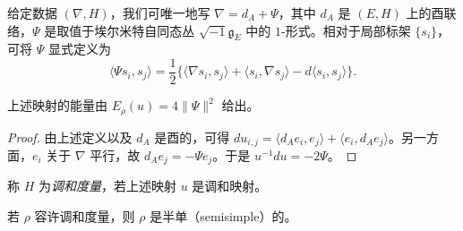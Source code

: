 给定数据 $(\nabla,H)$，我们可唯一地写 $\nabla=d_A+\Psi$，其中 $d_A$ 是 $(E,H)$ 上的酉联络，$\Psi$ 是取值于埃尔米特自同态丛 $\sqrt{-1}\mathfrak{g}_E$ 中的 $1$-形式。相对于局部标架 $\{s_i\}$，可将 $\Psi$ 显式定义为
\begin{equation}
\langle\Psi s_i,s_j\rangle=\frac{1}{2}\bigl\{\langle\nabla s_i,s_j\rangle+\langle s_i,\nabla s_j\rangle-d\langle s_i,s_j\rangle\bigr\}.
\label{eq:4.41}\tag{4.41}
\end{equation}

\begin{lemma}[{参看 [20]}]
上述映射的能量由 $E_\rho(u)=4\|\Psi\|^2$ 给出。
\end{lemma}

\begin{proof}
由上述定义以及 $d_A$ 是酉的，可得 $du_{i,j}=\langle d_Ae_i,e_j\rangle+\langle e_i,d_Ae_j\rangle$。另一方面，$e_i$ 关于 $\nabla$ 平行，故 $d_Ae_j=-\Psi e_j$。于是 $u^{-1}du=-2\Psi$。
\end{proof}

\begin{definition}
称 $H$ 为\emph{调和度量}，若上述映射 $u$ 是调和映射。
\end{definition}

\begin{proposition}[{Corlette, [11]}]
若 $\rho$ 容许调和度量，则 $\rho$ 是半单（semisimple）的。
\end{proposition}

